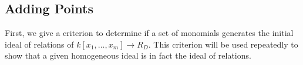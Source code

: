 \documentclass{amsart}
\theoremstyle{plain}
\theoremstyle{definition}
\theoremstyle{remark}
\numberwithin{equation}{section}
\newcommand\ssec{\subsection}
\newcommand\BN{{\mathbb N}}
\newcommand\BQ{{\mathbb Q}}
\DeclareMathOperator\di{Div}
\newcommand\sx{\mathscr X}
\newcommand{\halfcan}{L}
\DeclareMathOperator{\initial}{in_\prec}
\begin{document}
\ssec{Adding Points}
\label{ssec:add-points}
First, we give a criterion to determine if a set of monomials generates the initial ideal of relations of $k[x_1, \ldots, x_m] \to R_D$.  This criterion will be used repeatedly to show that a given homogeneous ideal is in fact the ideal of relations.
\end{document}
